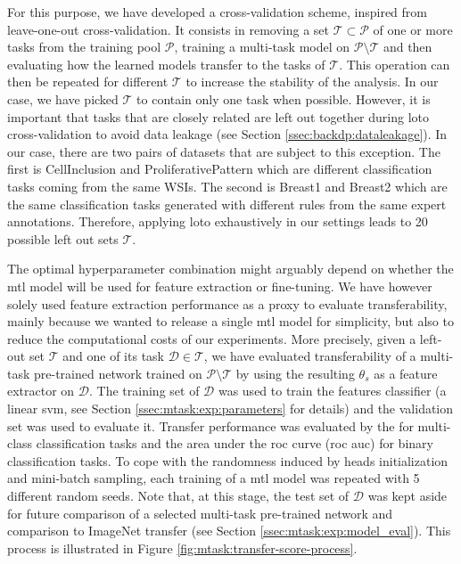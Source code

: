 For this purpose, we have developed a  cross-validation scheme, inspired from leave-one-out cross-validation. It consists in removing a set $\mathcal{T} \subset \mathcal{P}$ of one or more tasks from the training pool $\mathcal{P}$, training a multi-task model on $\mathcal{P} \setminus \mathcal{T}$ and then evaluating how the learned models transfer to the tasks of $\mathcal{T}$. This operation can then be repeated for different $\mathcal{T}$ to increase the stability of the analysis. In our case, we have picked $\mathcal{T}$ to contain only one task when possible. However, it is important that tasks that are closely related are left out together during \acrshort{loto} cross-validation to avoid data leakage (see Section \ref{ssec:backdp:dataleakage}). In our case, there are two pairs of datasets that are subject to this exception. The first is CellInclusion and ProliferativePattern which are different classification tasks coming from the same WSIs. The second is Breast1 and Breast2 which are the same classification tasks generated with different rules from the same expert annotations. Therefore, applying \acrshort{loto} exhaustively in our settings leads to 20 possible left out sets $\mathcal{T}$. 

The optimal hyperparameter combination might arguably depend on whether the \acrshort{mtl} model will be used for feature extraction or fine-tuning. We have however solely used feature extraction performance as a proxy to evaluate transferability, mainly because we wanted to release a single \acrshort{mtl} model for simplicity, but also to reduce the computational costs of our experiments. More precisely, given a left-out set $\mathcal{T}$ and one of its task $\mathcal{D} \in \mathcal{T}$, we have evaluated transferability of a multi-task pre-trained network trained on $\mathcal{P} \setminus \mathcal{T}$ by using the resulting $\theta_s$ as a feature extractor on $\mathcal{D}$. The training set of $\mathcal{D}$ was used to train the features classifier (\ie a linear \acrshort{svm}, see Section \ref{ssec:mtask:exp:parameters} for details) and the validation set was used to evaluate it. Transfer performance was evaluated by the  for multi-class classification tasks and the area under the \acrshort{roc} curve (\acrshort{roc} \acrshort{auc}) for binary classification tasks. To cope with the randomness induced by heads initialization and mini-batch sampling, each training of a \acrshort{mtl} model was repeated with 5 different random seeds. Note that, at this stage, the test set of $\mathcal{D}$ was kept aside for future comparison of a selected multi-task pre-trained network and comparison to ImageNet transfer (see Section \ref{ssec:mtask:exp:model_eval}). This process is illustrated in Figure \ref{fig:mtask:transfer-score-process}.

